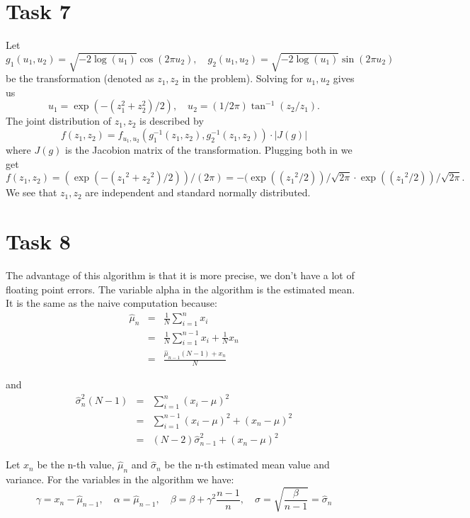 \documentclass[]{article}
\begin{document}
\section*{Task 7} Let \[g_1(u_1,u_2)=\sqrt{-2\log(u_1)}\cos(2\pi
u_2),\quad g_2(u_1,u_2)=\sqrt{-2\log(u_1)}\sin(2\pi u_2)\] be the transformation
(denoted as $z_1, z_2$ in the problem). Solving for $u_1,u_2$ gives us \[u_1 =
\exp({-(z_1 ^2+ z_2 ^2)/2}),\quad u_2 = (1/2\pi)\tan^{-1} (z_2/z_1).\] The joint
distribution of $z_1, z_2$ is described by \[f(z_1 ,z_2) = f_{u_1,
u_2}(g_1^{-1}(z_1,z_2),g_2^{-1}(z_1,z_2))\cdot| J(g) |\] where $J(g)$ is the
Jacobion matrix of the transformation. Plugging both in we get
\[f(z_1,z_2)=(\exp(-({z_1}^2+{z_2}^2)/2))/(2\pi)=-(\exp(({z_1}^2/2))/\sqrt{2\pi}\cdot\exp(({z_1}^2/2))/\sqrt{2\pi}.\]
We see that $z_1,z_2$ are independent and standard normally distributed.

\clearpage
\section*{Task 8} The advantage of this algorithm is that it is more precise, we
don't have a lot of floating point errors. The variable alpha in the algorithm
is the estimated mean. It is the same as the naive computation because: 
\begin{eqnarray}
    \hat{\mu}_n &= &\frac{1}{N}\sum_{i=1}^n x_i\nonumber\\
    &=&\frac{1}{N}\sum_{i=1}^{n-1}x_i+\frac{1}{N}x_n\nonumber\\
    &=&\frac{\hat{\mu}_{n-1}\left(N-1\right)+x_n}{N}\label{eqn:meanAlg}
\end{eqnarray}

and
\begin{eqnarray}
    \hat{\sigma}^{2}_n\left(N-1\right) &= &\sum_{i=1}^n
    \left(x_i-\mu\right)^2\nonumber\\
    &=&\sum_{i=1}^{n-1}\left(x_i-\mu\right)^2
    +\left(x_n-\mu\right)^2\nonumber\\
    &=&\left(N-2\right)\hat{\sigma}^{2}_{n-1} +
    \left(x_n-\mu\right)^2\label{eqn:varAlg}
\end{eqnarray}

Let $x_n$ be the n-th value, $\hat{\mu}_n$ and $\hat{\sigma}_n$ be the n-th
estimated mean value and variance.  For the variables in the
algorithm we have:
\[\gamma=x_n-\hat{\mu}_{n-1},\quad \alpha=\hat{\mu}_{n-1},\quad \beta = \beta +
\gamma^2\frac{n-1}{n},\quad \sigma = \sqrt{\frac{\beta}{n-1}} =
\hat{\sigma}_{n}\]
\end{document}
